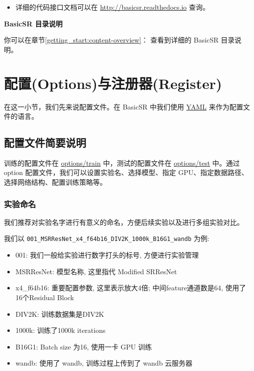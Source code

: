 \documentclass[../main.tex]{subfiles}
\begin{document}
\begin{itemize}
    \item 详细的代码接口文档可以在 \url{http://basicsr.readthedocs.io} 查询。
\end{itemize}

\begin{note} %
    \textbf{BasicSR 目录说明}

    你可以在章节\ref{getting_start:content-overview}： 查看到详细的 BasicSR 目录说明。
\end{note}

\section{配置(Options)与注册器(Register)}\label{code_structure:register}
在这一小节，我们先来说配置文件。在 BasicSR 中我们使用 \href{https://yaml.org/}{YAML} 来作为配置文件的语言。

\subsection{配置文件简要说明}
训练的配置文件在 \href{https://github.com/XPixelGroup/BasicSR/tree/master/options/train}{options/train} 中，测试的配置文件在 \href{https://github.com/XPixelGroup/BasicSR/tree/master/options/test}{options/test} 中。通过 option 配置文件，我们可以设置实验名、选择模型、指定 GPU、指定数据路径、选择网络结构、配置训练策略等。

\subsubsection{实验命名}
我们推荐对实验名字进行有意义的命名，方便后续实验以及进行多组实验对比。

我们以 \texttt{001\_MSRResNet\_x4\_f64b16\_DIV2K\_1000k\_B16G1\_wandb} 为例:

\begin{itemize}
\item 001: 我们一般给实验进行数字打头的标号, 方便进行实验管理
\item MSRResNet: 模型名称, 这里指代 Modified SRResNet
\item x4\_f64b16: 重要配置参数, 这里表示放大4倍; 中间feature通道数是64, 使用了16个Residual Block
\item DIV2K: 训练数据集是DIV2K
\item 1000k: 训练了1000k iterations
\item B16G1: Batch size 为16, 使用一卡 GPU 训练
\item wandb: 使用了 wandb, 训练过程上传到了 wandb 云服务器
\end{itemize}
\end{document}
